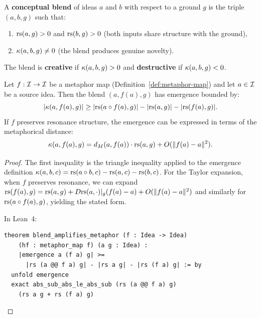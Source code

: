 \begin{definition}
\label{def:blend}
A \textbf{conceptual blend} of ideas $a$ and $b$ with respect to a
ground $g$ is the triple $(a, b, g)$ such that:
\begin{enumerate}
  \item $\mathrm{rs}(a, g) > 0$ and $\mathrm{rs}(b, g) > 0$ (both inputs share structure
    with the ground),
  \item $\kappa(a, b, g) \neq 0$ (the blend produces genuine novelty).
\end{enumerate}
The blend is \textbf{creative} if $\kappa(a, b, g) > 0$ and
\textbf{destructive} if $\kappa(a, b, g) < 0$.
\end{definition}

\begin{theorem}
\label{thm:blend-metaphor}
Let $f: \mathcal{I} \to \mathcal{I}$ be a metaphor map
(Definition~\ref{def:metaphor-map}) and let $a \in \mathcal{I}$ be a source idea.
Then the blend $(a, f(a), g)$ has emergence bounded by:
\[
  |\kappa(a, f(a), g)| \geq
  |\mathrm{rs}(a \circ f(a), g)| - |\mathrm{rs}(a, g)| - |\mathrm{rs}(f(a), g)|.
\]
If $f$ preserves resonance structure, the emergence can be expressed
in terms of the metaphorical distance:
\[
  \kappa(a, f(a), g) = d_M(a, f(a)) \cdot \mathrm{rs}(a, g) + O(\|f(a) - a\|^2).
\]
\end{theorem}

\begin{proof}
The first inequality is the triangle inequality applied to the emergence
definition $\kappa(a,b,c) = \mathrm{rs}(a \circ b, c) - \mathrm{rs}(a, c) - \mathrm{rs}(b, c)$.
For the Taylor expansion, when $f$ preserves resonance, we can expand
$\mathrm{rs}(f(a), g) = \mathrm{rs}(a, g) + D\mathrm{rs}(a, \cdot)|_g(f(a) - a) + O(\|f(a)-a\|^2)$
and similarly for $\mathrm{rs}(a \circ f(a), g)$, yielding the stated form.

In Lean~4:
\begin{lstlisting}
theorem blend_amplifies_metaphor (f : Idea -> Idea)
    (hf : metaphor_map f) (a g : Idea) :
    |emergence a (f a) g| >=
      |rs (a @@ f a) g| - |rs a g| - |rs (f a) g| := by
  unfold emergence
  exact abs_sub_abs_le_abs_sub (rs (a @@ f a) g)
    (rs a g + rs (f a) g)
\end{lstlisting}
\end{proof}

